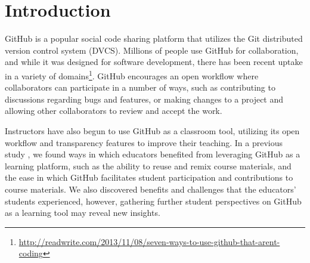 \section{Introduction}


GitHub is a popular social code sharing platform that utilizes the Git distributed version control system (DVCS). Millions of people use GitHub for collaboration, and while it was designed for software development, there has been recent uptake in a variety of domains\footnote{\url{http://readwrite.com/2013/11/08/seven-ways-to-use-github-that-arent-coding}}. GitHub encourages an open workflow where collaborators can participate in a number of ways, such as contributing to discussions regarding bugs and features, or making changes to a project and allowing other collaborators to review and accept the work.

Instructors have also begun to use GitHub as a classroom tool, utilizing its open workflow and transparency features to improve their teaching. In a previous study \cite{zagalsky2015emergence}, we found ways in which educators benefited from leveraging GitHub as a learning platform, such as the ability to reuse and remix course materials, and the ease in which GitHub facilitates student participation and contributions to course materials. We also discovered benefits and challenges that the educators' students experienced, however, gathering further student perspectives on GitHub as a learning tool may reveal new insights.




